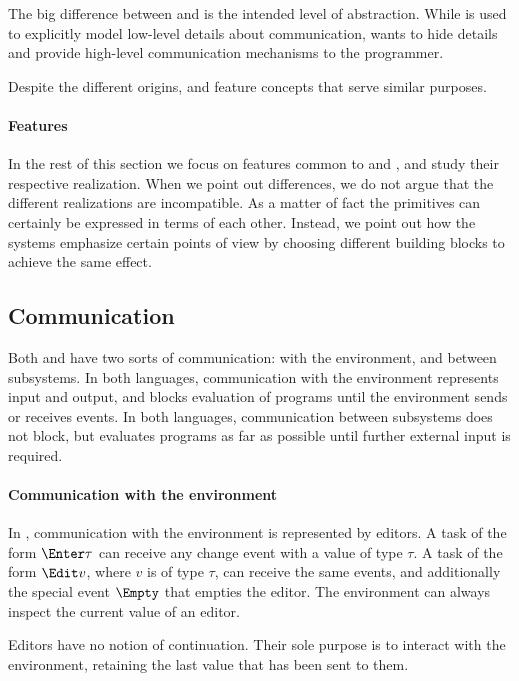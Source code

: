 The big difference between \CSP and \TOP is the intended level of abstraction.
While \CSP is used to explicitly model low-level details about communication, \TOP wants to hide details and provide high-level communication mechanisms to the programmer.

Despite the different origins, \TOP and \CSP feature concepts that serve similar purposes.


\paragraph{Features}

In the rest of this section we focus on features common to \TOP and \CSP, and study their respective realization.
When we point out differences, we do not argue that the different realizations are incompatible.
As a matter of fact the primitives can certainly be expressed in terms of each other.
Instead, we point out how the systems emphasize certain points of view by choosing different building blocks to achieve the same effect.


\subsection{Communication}

Both \TOP and \CSP have two sorts of communication: with the environment, and between subsystems.
In both languages, communication with the environment represents input and output, and blocks evaluation of programs until the environment sends or receives events.
In both languages, communication between subsystems does not block, but evaluates programs as far as possible until further external input is required.

\paragraph{Communication with the environment}
In \TOP, communication with the environment is represented by editors.
A task of the form $\Enter \tau$ can receive any change event with a value of type $\tau$.
A task of the form $\Edit v$, where $v$ is of type $\tau$, can receive the same
events, and additionally the special event $\Empty$ that empties the editor.
The environment can always inspect the current value of an editor.

Editors have no notion of continuation.
Their sole purpose is to interact with the environment, retaining the last value that has been sent to them.

